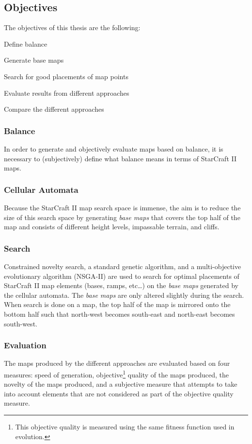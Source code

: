 \subsection{Objectives}
\label{introduction_starcraft_objectives}
The objectives of this thesis are the following:
\begin{my_enumerate}
\item Define balance
\item Generate base maps
\item Search for good placements of map points
\item Evaluate results from different approaches
\item Compare the different approaches
\end{my_enumerate}

\subsubsection{Balance}
In order to generate and objectively evaluate maps based on balance, it is necessary to (subjectively) define what balance means in terms of StarCraft II maps.
\subsubsection{Cellular Automata}
Because the StarCraft II map search space is immense, the aim is to reduce the size of this search space by generating \textit{base maps} that covers the top half of the map and consists of different height levels, impassable terrain, and cliffs. 
\subsubsection{Search}
Constrained novelty search, a standard genetic algorithm, and a multi-objective evolutionary algorithm (NSGA-II) are used to search for optimal placements of StarCraft II map elements (bases, ramps, etc\ldots) on the \textit{base maps} generated by the cellular automata. The \textit{base maps} are only altered slightly during the search. When search is done on a map, the top half of the map is mirrored onto the bottom half such that north-west becomes south-east and north-east becomes south-west.
\subsubsection{Evaluation}
The maps produced by the different approaches are evaluated based on four measures: speed of generation, objective\footnote{This objective quality is measured using the same fitness function used in evolution.} quality of the maps produced, the novelty of the maps produced, and a subjective measure that attempts to take into account elements that are not considered as part of the objective quality measure.

